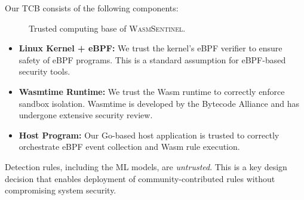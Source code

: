 Our TCB consists of the following components:

\begin{figure}[t]
\centering
{}
\caption{Trusted computing base of \textsc{WasmSentinel}.}
\label{fig:tcb}
\end{figure}

\begin{itemize}
    \item \textbf{Linux Kernel + eBPF:} We trust the kernel's eBPF verifier to ensure safety of eBPF programs. This is a standard assumption for eBPF-based security tools.

    \item \textbf{Wasmtime Runtime:} We trust the Wasm runtime to correctly enforce sandbox isolation. Wasmtime is developed by the Bytecode Alliance and has undergone extensive security review.

    \item \textbf{Host Program:} Our Go-based host application is trusted to correctly orchestrate eBPF event collection and Wasm rule execution.
\end{itemize}

Detection rules, including the ML models, are \textit{untrusted}.
This is a key design decision that enables deployment of community-contributed rules without compromising system security.
